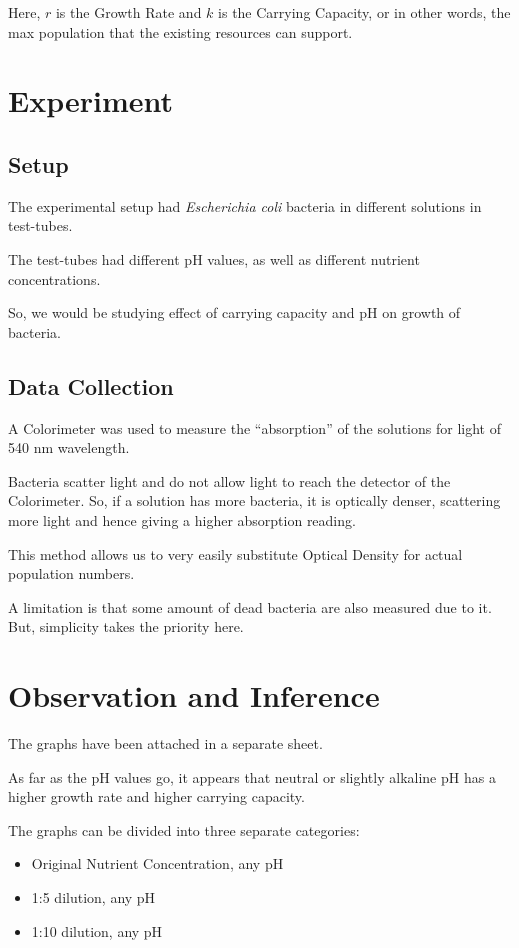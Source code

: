 \documentclass[twocolumn]{article}
\begin{document}
Here, $r$ is the Growth Rate and $k$ is the Carrying Capacity, or in other words, the max population that the existing resources can support.

\section{Experiment}

\subsection{Setup}

The experimental setup had {\em{Escherichia coli}} bacteria in different solutions in test-tubes.

The test-tubes had different pH values, as well as different nutrient concentrations.

So, we would be studying effect of carrying capacity and pH on growth of bacteria.

\subsection{Data Collection}

A Colorimeter was used to measure the ``absorption'' of the solutions for light of 540 nm wavelength.

Bacteria scatter light and do not allow light to reach the detector of the Colorimeter. So, if a solution has more bacteria, it is optically denser, scattering more light and hence giving a higher absorption reading.

This method allows us to very easily substitute Optical Density for actual population numbers. 


A limitation is that some amount of dead bacteria are also measured due to it. But, simplicity takes the priority here.


\section{Observation and Inference}

The graphs have been attached in a separate sheet. 

As far as the pH values go, it appears that neutral or slightly alkaline pH has a higher growth rate and higher carrying capacity. 

The graphs can be divided into three separate categories:

\begin{itemize}
    \item Original Nutrient Concentration, any pH
    \item 1:5 dilution, any pH
    \item 1:10 dilution, any pH
\end{itemize}
\end{document}
